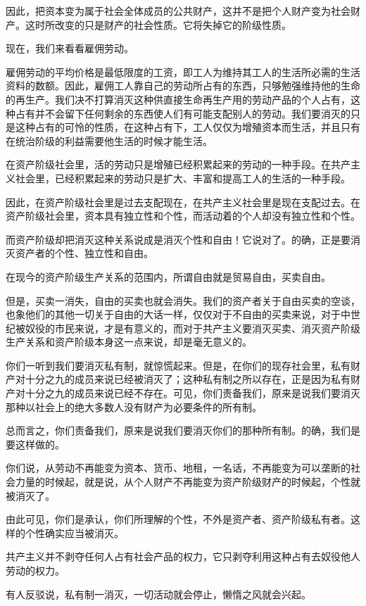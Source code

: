 \documentclass[UTF8]{ctexart}
\begin{document}
因此，把资本变为属于社会全体成员的公共财产，这并不是把个人财产变为社会财产。这时所改变的只是财产的社会性质。它将失掉它的阶级性质。

现在，我们来看看雇佣劳动。

雇佣劳动的平均价格是最低限度的工资，即工人为维持其工人的生活所必需的生活资料的数额。因此，雇佣工人靠自己的劳动所占有的东西，只够勉强维持他的生命的再生产。我们决不打算消灭这种供直接生命再生产用的劳动产品的个人占有，这种占有并不会留下任何剩余的东西使人们有可能支配别人的劳动。我们要消灭的只是这种占有的可怜的性质，在这种占有下，工人仅仅为增殖资本而生活，并且只有在统治阶级的利益需要他生活的时候才能生活。

在资产阶级社会里，活的劳动只是增殖已经积累起来的劳动的一种手段。在共产主义社会里，已经积累起来的劳动只是扩大、丰富和提高工人的生活的一种手段。

因此，在资产阶级社会里是过去支配现在，在共产主义社会里是现在支配过去。在资产阶级社会里，资本具有独立性和个性，而活动着的个人却没有独立性和个性。

而资产阶级却把消灭这种关系说成是消灭个性和自由！它说对了。的确，正是要消灭资产者的个性、独立性和自由。

在现今的资产阶级生产关系的范围内，所谓自由就是贸易自由，买卖自由。

但是，买卖一消失，自由的买卖也就会消失。我们的资产者关于自由买卖的空谈，也象他们的其他一切关于自由的大话一样，仅仅对于不自由的买卖来说，对于中世纪被奴役的市民来说，才是有意义的，而对于共产主义要消灭买卖、消灭资产阶级生产关系和资产阶级本身这一点来说，却是毫无意义的。

你们一听到我们要消灭私有制，就惊慌起来。但是，在你们的现存社会里，私有财产对十分之九的成员来说已经被消灭了；这种私有制之所以存在，正是因为私有财产对十分之九的成员来说已经不存在。可见，你们责备我们，原来是说我们要消灭那种以社会上的绝大多数人没有财产为必要条件的所有制。

总而言之，你们责备我们，原来是说我们要消灭你们的那种所有制。的确，我们是要这样做的。

你们说，从劳动不再能变为资本、货币、地租，一名话，不再能变为可以垄断的社会力量的时候起，就是说，从个人财产不再能变为资产阶级财产的时候起，个性就被消灭了。

由此可见，你们是承认，你们所理解的个性，不外是资产者、资产阶级私有者。这样的个性确实应当被消灭。

共产主义并不剥夺任何人占有社会产品的权力，它只剥夺利用这种占有去奴役他人劳动的权力。

有人反驳说，私有制一消灭，一切活动就会停止，懒惰之风就会兴起。
\end{document}
